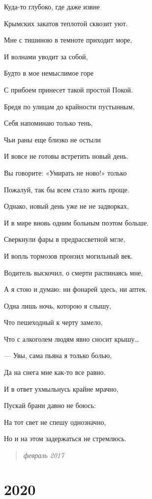 \documentclass[
  a5paperpaper,
  DIV=11,
  numbers=noendperiod]{scrreprt}
\begin{document}
Куда-то глубоко, где даже извне

Крымских закатов теплотой сквозит уют.

Мне с тишиною в темноте приходит море,

И волнами уводит за собой,

Будто в мое немыслимое горе

С прибоем принесет такой простой Покой.

Бредя по улицам до крайности пустынным,

Себя напоминаю только тень,

Чьи раны еще близко не остыли

И вовсе не готовы встретить новый день.

Вы говорите: «Умирать не ново!» только

Пожалуй, так бы всем стало жить проще.

Однако, новый день уже не не задворках,

И в мире вновь одним больным поэтом больше.

Сверкнули фары в предрассветной мгле,

И вопль тормозов пронзил могильный век.

Водитель выскочил, о смерти распинаясь мне,

А я стою и думаю: ни фонарей здесь, ни аптек.

Одна лишь ночь, которою я слышу,

Что пешеходный к черту замело,

Что с алкоголем людям явно сносит крышу\ldots{}

--- Увы, сама пьяна я только болью,

Да на снега мне как-то все равно.

И в ответ ухмыльнусь крайне мрачно,

Пускай брани давно не боюсь:

На тот свет не спешу однозначно,

Но и на этом задержаться не стремлюсь.

\begin{quote}
\emph{февраль 2017}
\end{quote}


\chapter{2020}\label{section-8}

\section{}\label{section-9}
\end{document}
